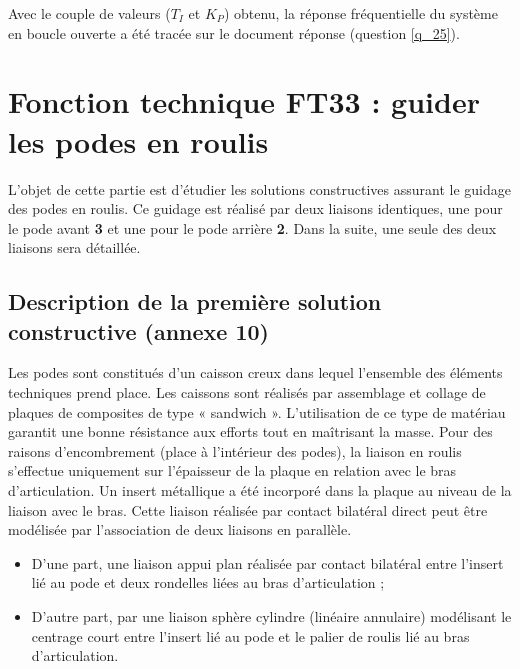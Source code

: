 Avec le couple de valeurs ($T_I$ et $K_P$) obtenu, la réponse fréquentielle du système en boucle ouverte a été tracée sur le document réponse (question \ref{q_25}).

\ifprof
\begin{corrige}
\end{corrige}
\else
\fi


\section{Fonction technique FT33 : guider les podes en roulis}

L’objet de cette partie est d’étudier les solutions constructives assurant le guidage des podes en roulis. Ce guidage est réalisé par deux liaisons identiques, une pour le pode avant \textbf{3} et une pour le pode arrière \textbf{2}. Dans la suite, une seule des deux liaisons sera détaillée.

\subsection{Description de la première solution constructive (annexe 10)}

Les podes sont constitués d’un caisson creux dans lequel l’ensemble des éléments techniques prend place. Les caissons sont réalisés par assemblage et collage de plaques de composites de type « sandwich ». L’utilisation de ce
type de matériau garantit une bonne résistance aux efforts tout en maîtrisant la masse.
Pour des raisons d’encombrement (place à l’intérieur des podes), la liaison en roulis s’effectue uniquement sur l’épaisseur de la plaque en relation avec le bras d’articulation. Un insert métallique a été incorporé dans la plaque au niveau de la liaison avec le bras. Cette liaison réalisée par contact bilatéral direct peut être modélisée par l’association de deux liaisons en parallèle.
\begin{itemize}
\item D’une part, une liaison appui plan réalisée par contact bilatéral entre l’insert lié au pode et deux rondelles liées
au bras d’articulation ;
\item D’autre part, par une liaison sphère cylindre (linéaire annulaire) modélisant le centrage court entre l’insert lié
au pode et le palier de roulis lié au bras d’articulation.
\end{itemize}

